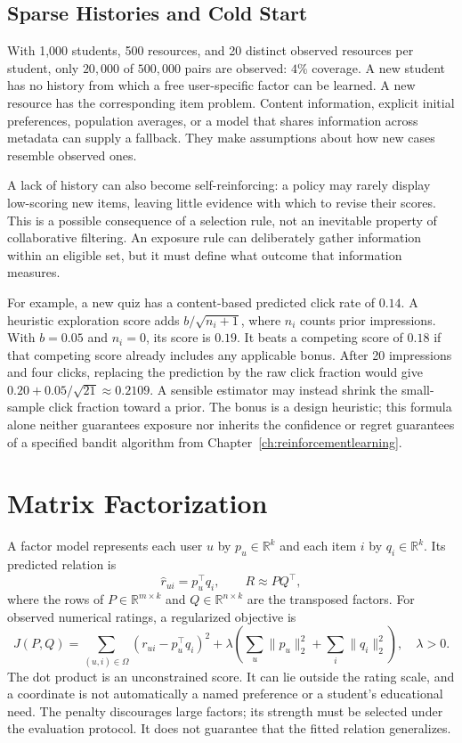 \subsection{Sparse Histories and Cold Start}

With 1,000 students, 500 resources, and 20 distinct observed resources per student, only $20{,}000$ of $500{,}000$ pairs are observed: $4\%$ coverage. A new student has no history from which a free user-specific factor can be learned. A new resource has the corresponding item problem. Content information, explicit initial preferences, population averages, or a model that shares information across metadata can supply a fallback. They make assumptions about how new cases resemble observed ones.

A lack of history can also become self-reinforcing: a policy may rarely display low-scoring new items, leaving little evidence with which to revise their scores. This is a possible consequence of a selection rule, not an inevitable property of collaborative filtering. An exposure rule can deliberately gather information within an eligible set, but it must define what outcome that information measures.

For example, a new quiz has a content-based predicted click rate of $0.14$. A heuristic exploration score adds $b/\sqrt{n_i+1}$, where $n_i$ counts prior impressions. With $b=0.05$ and $n_i=0$, its score is $0.19$. It beats a competing score of $0.18$ if that competing score already includes any applicable bonus. After 20 impressions and four clicks, replacing the prediction by the raw click fraction would give $0.20+0.05/\sqrt{21}\approx0.2109$. A sensible estimator may instead shrink the small-sample click fraction toward a prior. The bonus is a design heuristic; this formula alone neither guarantees exposure nor inherits the confidence or regret guarantees of a specified bandit algorithm from Chapter~\ref{ch:reinforcementlearning}.

\section{Matrix Factorization}
\label{sec:matrix-factorization}

A factor model represents each user $u$ by $p_u\in\mathbb R^k$ and each item $i$ by $q_i\in\mathbb R^k$. Its predicted relation is
\[
\widehat r_{ui}=p_u^\top q_i,
\qquad R\approx P Q^\top,
\]
where the rows of $P\in\mathbb R^{m\times k}$ and $Q\in\mathbb R^{n\times k}$ are the transposed factors. For observed numerical ratings, a regularized objective is
\[
J(P,Q)=\sum_{(u,i)\in\Omega}(r_{ui}-p_u^\top q_i)^2
+\lambda\left(\sum_u\|p_u\|_2^2+\sum_i\|q_i\|_2^2\right),
\quad \lambda>0.
\]
The dot product is an unconstrained score. It can lie outside the rating scale, and a coordinate is not automatically a named preference or a student's educational need. The penalty discourages large factors; its strength must be selected under the evaluation protocol. It does not guarantee that the fitted relation generalizes.

